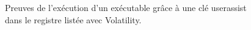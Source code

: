 \begin{figure}
    \centering
    \caption{Preuves de l'exécution d'un exécutable grâce à une clé userassist dans le registre listée avec Volatility.}
    \label{fig:volatility-userassist}
\end{figure}

